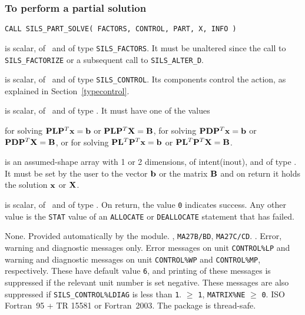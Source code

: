 \documentclass{galahad}
\newcommand{\packagename}{SILS}
\begin{document}
\subsubsection{To perform a partial solution}

\hskip0.5in
{\tt CALL \packagename\_PART\_SOLVE( FACTORS, CONTROL, PART, X, INFO )}

\begin{description}
 is scalar, of \intentin\ and of type {\tt \packagename\_FACTORS}.
It must be unaltered since the call to {\tt \packagename\_FACTORIZE}
or a subsequent call to {\tt \packagename\_ALTER\_D}.

 is scalar, of \intentin\ and of type {\tt \packagename\_CONTROL}.
Its components control the action, as explained in Section~\ref{typecontrol}.

 is scalar, of \intentin\, and of type \character. It
must have one of the values
\begin{description}
 for solving ${\mathbf{P}} {\mathbf{L}} {\mathbf{P}}^T {\mathbf{x}} =  {\mathbf{b}}$ or
                     ${\mathbf{P}} {\mathbf{L}} {\mathbf{P}}^T {\mathbf{X}} =  {\mathbf{B}}$,
 for solving ${\mathbf{P}} {\mathbf{D}} {\mathbf{P}}^T {\mathbf{x}} =  {\mathbf{b}}$ or
                  ${\mathbf{P}} {\mathbf{D}} {\mathbf{P}}^T {\mathbf{X}} =  {\mathbf{B}}$, or
 for solving ${\mathbf{P}} {\mathbf{L}}^T {\mathbf{P}}^T {\mathbf{x}} =  {\mathbf{b}}$ or
                  ${\mathbf{P}} {\mathbf{L}}^T {\mathbf{P}}^T {\mathbf{X}} = {\mathbf{B}}$.
\end{description}

 is an assumed-shape array with 1 or 2 dimensions, of
intent(inout), and of type \realdp.  It must be set by the user to the
vector ${\mathbf{b}}$ or the matrix ${\mathbf{B}}$ and on return it holds the solution
${\mathbf{x}}$ or ${\mathbf{X}}$.

 is scalar, of \intentout\, and of type \integer.  On return,
the value {\tt 0} indicates success. Any other value is the {\tt STAT} value of
an  {\tt ALLOCATE} or {\tt DEALLOCATE} statement that has failed.

\end{description}


\galgeneral

\galcommon None.
\galworkspace Provided automatically by the module.
, {\tt MA27B/BD}, {\tt MA27C/CD}.
.
\galio Error, warning and diagnostic messages only.  Error
 messages on unit {\tt CONTROL\%LP} and warning and diagnostic messages on unit
 {\tt CONTROL\%WP} and  {\tt CONTROL\%MP}, respectively.  These have default
 value {\tt 6},  and printing of these messages
 is suppressed if the relevant unit number is set negative.  These messages are
 also suppressed if {\tt \packagename\_CONTROL\%LDIAG} is less than {\tt 1}.
 $\geq$ {\tt 1},
                 {\tt MATRIX\%NE} $\geq$ {\tt 0}.
\galportability ISO Fortran~95 + TR 15581 or Fortran~2003.
The package is thread-safe.
\end{document}
